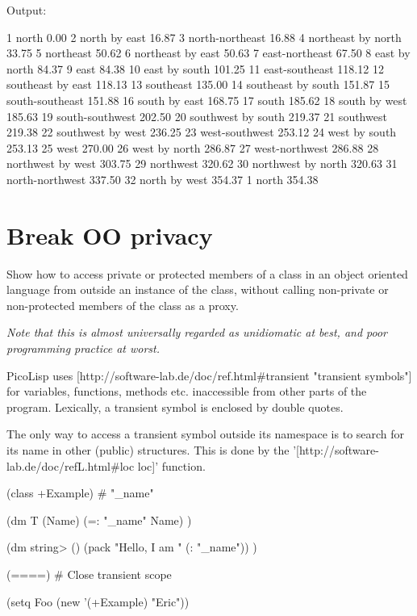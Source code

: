 \begin{wideverbatim}

Output:

  1 north                 0.00
  2 north by east        16.87
  3 north-northeast      16.88
  4 northeast by north   33.75
  5 northeast            50.62
  6 northeast by east    50.63
  7 east-northeast       67.50
  8 east by north        84.37
  9 east                 84.38
 10 east by south       101.25
 11 east-southeast      118.12
 12 southeast by east   118.13
 13 southeast           135.00
 14 southeast by south  151.87
 15 south-southeast     151.88
 16 south by east       168.75
 17 south               185.62
 18 south by west       185.63
 19 south-southwest     202.50
 20 southwest by south  219.37
 21 southwest           219.38
 22 southwest by west   236.25
 23 west-southwest      253.12
 24 west by south       253.13
 25 west                270.00
 26 west by north       286.87
 27 west-northwest      286.88
 28 northwest by west   303.75
 29 northwest           320.62
 30 northwest by north  320.63
 31 north-northwest     337.50
 32 north by west       354.37
  1 north               354.38

\end{wideverbatim}

\pagebreak{}
\section*{Break OO privacy}

Show how to access private or protected members of a class in an object
oriented language from outside an instance of the class, without calling
non-private or non-protected members of the class as a proxy.

\emph{Note that this is almost universally regarded as unidiomatic at
best, and poor programming practice at worst.}



\begin{wideverbatim}

PicoLisp uses [http://software-lab.de/doc/ref.html#transient "transient
symbols"] for variables, functions, methods etc. inaccessible from other parts
of the program. Lexically, a transient symbol is enclosed by double quotes.

The only way to access a transient symbol outside its namespace is to search for
its name in other (public) structures. This is done by the
'[http://software-lab.de/doc/refL.html#loc loc]' function.

(class +Example)
# "_name"

(dm T (Name)
   (=: "_name" Name) )

(dm string> ()
   (pack "Hello, I am " (: "_name")) )

(====)  # Close transient scope

(setq Foo (new '(+Example) "Eric"))

\end{wideverbatim}

